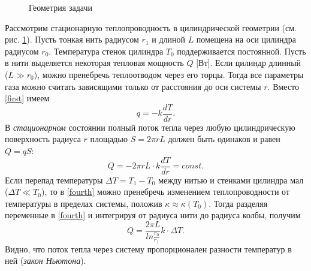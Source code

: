 \documentclass[a4paper, 12pt]{article}
\begin{document}
    \begin{figure}
        \caption{Геометрия задачи}
        \label{pic1}
    \end{figure}
    Рассмотрим стационарную теплопроводность в цилиндрической геометрии (см. рис. \ref{pic1}). Пусть тонкая нить радиусом $ r_{1} $ и длиной $ L $ помещена на оси цилиндра радиусом $ r_{0} $. Температура стенок цилиндра $ T_{0} $ поддерживается постоянной. Пусть в нити выделяется некоторая тепловая мощность $ Q $ [Вт]. Если цилиндр длинный ($ L \gg r_{0} $), можно пренебречь теплоотводом через его торцы. Тогда все параметры газа можно считать зависящими только от расстояния до оси системы $ r $. Вместо \eqref{first} имеем
    \begin{equation}
        q = -k \frac{dT}{dr}.
        \label{third}
    \end{equation}
    В \textit{стационарном} состоянии полный поток тепла через любую цилиндрическую поверхность радиуса $ r $ площадью $ S = 2 \pi r L$ должен быть одинаков и равен $ Q = q S $:
    \begin{equation}
        Q = -2 \pi r L \cdot k \frac{dT}{dr} = const.
        \label{fourth}
    \end{equation}
    Если перепад температуры $ \Delta T = T_{1} - T_{0} $ между нитью и стенками цилиндра мал ($ \Delta T \ll T_{0} $), то в \eqref{fourth} можно пренебречь изменением теплопроводности от температуры в пределах системы, положив $ \kappa \approx \kappa (T_{0}) $. Тогда разделяя переменные в \eqref{fourth} и интегрируя от радиуса нити до радиуса колбы, получим
    \begin{equation}
        Q = \frac{2 \pi L}{ln \frac{r_{0}}{r_{1}}}k \cdot \Delta T.
        \label{fifth}
    \end{equation}
    Видно, что поток тепла через систему пропорционален разности температур в ней (\textit{закон Ньютона}).\\
    
\end{document}

